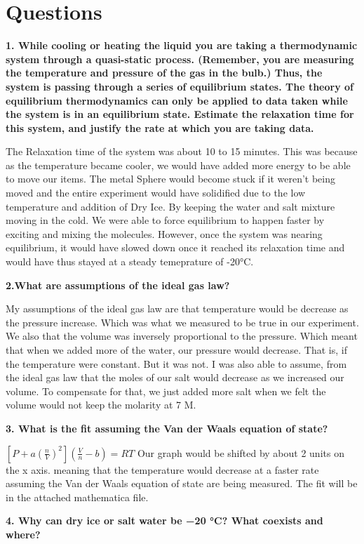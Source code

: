 \documentclass[12pt]{report}
\begin{document}
\section{Questions}
	\textbf{1. While cooling or heating the liquid you are taking a thermodynamic system through a quasi-static process. (Remember, you are measuring the temperature and pressure of the gas in the bulb.) Thus,
the system is passing through a series of equilibrium states. The theory of equilibrium thermodynamics
can only be applied to data taken while the system is in an equilibrium state. Estimate the relaxation
time for this system, and justify the rate at which you are taking data.
}

	The Relaxation time of the system was about 10 to 15 minutes. This was because as the temperature became cooler, we would have added more energy to be able to move our items. The metal Sphere would become stuck if it weren't being moved and the entire experiment would have solidified due to the low temperature and addition of Dry Ice. By keeping the water and salt mixture moving in the cold. We were able to force equilibrium to happen faster by exciting and mixing the molecules. However, once the system was nearing equilibrium, it would have slowed down once it reached its relaxation time and would have thus stayed at a steady temeprature of -20°C.

	\textbf{2.What are assumptions of the ideal gas law?}

	My assumptions of the ideal gas law are that temperature would be decrease as the pressure increase. Which was what we measured to be true in our experiment. We also that the volume was inversely proportional to the pressure. Which meant that when we added more of the water, our pressure would decrease. That is, if the temperature were constant. But it was not. I was also able to assume, from the ideal gas law that the moles of our salt would decrease as we increased our volume. To compensate for that, we just added more salt when we felt the volume would not keep the molarity at 7 M.

	\textbf{3. What is the fit assuming the Van der Waals equation of state?}

		$[P+a(\frac{n}{V})^2](\frac{V}{n} - b) = RT$
	Our graph would be shifted by about 2 units on the x axis. meaning that the temperature would decrease at a faster rate assuming the Van der Waals equation of state are being measured. The fit will be in the attached mathematica file.

	\textbf{4. Why can dry ice or salt water be −20 °C? What coexists and where?}
\end{document}
